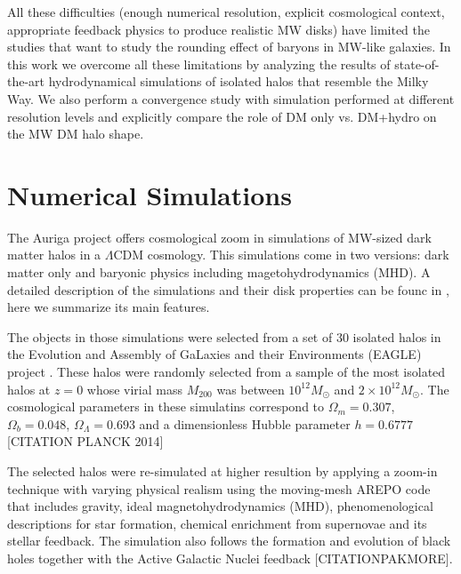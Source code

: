\documentclass[a4paper,fleqn,usenatbib]{mnras}
\begin{document}
\citep{Pedrosa10}


All these difficulties (enough numerical resolution, explicit
cosmological context, appropriate feedback physics to produce
realistic MW disks) have limited the studies that want to study the
rounding effect of baryons in MW-like galaxies.
In this work we overcome all these limitations by analyzing the
results of state-of-the-art hydrodynamical simulations of isolated
halos that resemble the Milky Way.
We also perform a convergence study with simulation performed at
different resolution levels and explicitly compare the role of DM only
vs. DM+hydro on the MW DM halo shape.


\section{Numerical Simulations}


The Auriga project offers cosmological zoom in simulations of MW-sized 
dark matter halos in a $\Lambda$CDM cosmology. 
This simulations come in two versions: dark matter only and
baryonic physics including magetohydrodynamics (MHD).
A detailed description of the simulations and their
disk properties can be founc in \citep{auriga}, here we summarize its
main features.

The objects in those simulations were selected from a set of 30
isolated halos in the Evolution and Assembly of GaLaxies and their
Environments (EAGLE)  project \citep{Eagle}.   
These halos were randomly selected from a sample of the most isolated
halos at $z=0$ whose virial mass $M_{200}$ was between $10^{12}M_\odot$ and
$2\times 10^{12}M_\odot$. 
The cosmological parameters in these simulatins correspond to
$\Omega_m=0.307$, $\Omega_b=0.048$, $\Omega_\Lambda=0.693$ and a
dimensionless Hubble parameter $h=0.6777$ [CITATION PLANCK 2014]


The selected halos were re-simulated at higher resultion by applying a
zoom-in technique with varying physical realism using the moving-mesh AREPO code
that includes gravity, ideal magnetohydrodynamics (MHD), 
phenomenological descriptions for star formation, chemical enrichment
from supernovae and its stellar feedback.  The simulation also follows
the formation and evolution of black holes together with the Active
Galactic Nuclei feedback \citep{arepo} [CITATIONPAKMORE].  
\end{document}
